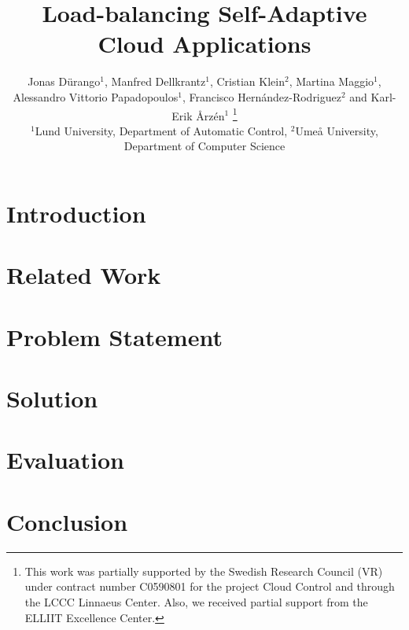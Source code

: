 \documentclass[letterpaper, 10 pt, conference]{ieeeconf}
\title{\LARGE \bf Load-balancing Self-Adaptive Cloud Applications}
\author{Jonas D{\"u}rango{$^1$}, Manfred Dellkrantz{$^1$}, Cristian Klein{$^2$}, Martina Maggio{$^1$}, \\
Alessandro Vittorio Papadopoulos{$^1$}, Francisco Hern{\'a}ndez-Rodriguez{$^2$} and Karl-Erik {\AA}rz\'en{$^1$} \thanks{This work was partially supported by the Swedish Research Council
  (VR) under contract number C0590801 for the project Cloud Control
  and through the LCCC Linnaeus Center. Also, we received partial
  support from the ELLIIT Excellence Center.}\\
{\small {$^1$}Lund University, Department of Automatic Control, {$^2$}Ume{\aa} University, Department of Computer Science}}
\begin{document}
\maketitle
\thispagestyle{empty}
\pagestyle{empty}

\begin{abstract}

\end{abstract}

\section{Introduction}
\label{sec:introduction}


\section{Related Work}
\label{sec:related}


\section{Problem Statement}
\label{sec:problem}


\section{Solution}
\label{sec:solution}


\section{Evaluation}
\label{sec:evaluation}


\section{Conclusion}
\label{sec:conclusion}


\printbibliography
\end{document}
